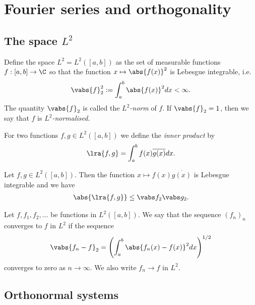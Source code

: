 \documentclass{article}
\begin{document}
\section{Fourier series and orthogonality}

\subsection{The space $L^2$}

\begin{definition}[Notes 5.1]
	Define the space $L^2=L^2([a,b])$ as the set of measurable functions $f:[a,b]\to\C$
	so that the function $x\mapsto \abs{f(x)}^2$ is Lebesgue integrable, i.e.
	\begin{align*}
		\vabs{f}_2^2 := \int_a^b \abs{f(x)}^2 dx < \infty.
	\end{align*}
	The quantity $\vabs{f}_2$ is called the \emph{$L^2$-norm} of $f$. If $\vabs{f}_2=1$,
	then we say that $f$ is \emph{$L^2$-normalised}.
\end{definition}

\begin{definition}[Notes 5.2]
	For two functions $f,g\in L^2([a,b])$ we define the \emph{inner product} by
	\begin{align*}
		\lra{f,g} = \int_a^b f(x)\overline{g(x)}dx.
	\end{align*}
\end{definition}

\begin{theorem}
	Let $f,g\in L^2([a,b])$. Then the function $x\mapsto f(x)\overline{g(x)}$ is Lebesgue
	integrable and we have
	\begin{align*}
		\abs{\lra{f,g}}\leq \vabs f_2\vabs g_2.
	\end{align*}
\end{theorem}

\begin{definition}[Notes 5.3]
	Let $f,f_1,f_2,...$ be functions in $L^2([a,b])$. We say that the sequence $(f_n)_n$ converges
	to $f$ in $L^2$ if the sequence
	\begin{align*}
		\vabs{f_n - f}_2 = \left(\int_a^b \abs{f_n(x)-f(x)}^2dx\right)^{1/2}
	\end{align*}
	converges to zero as $n\to\infty$. We also write $f_n\to f$ in $L^2$.
\end{definition}

\subsection{Orthonormal systems}
\end{document}

